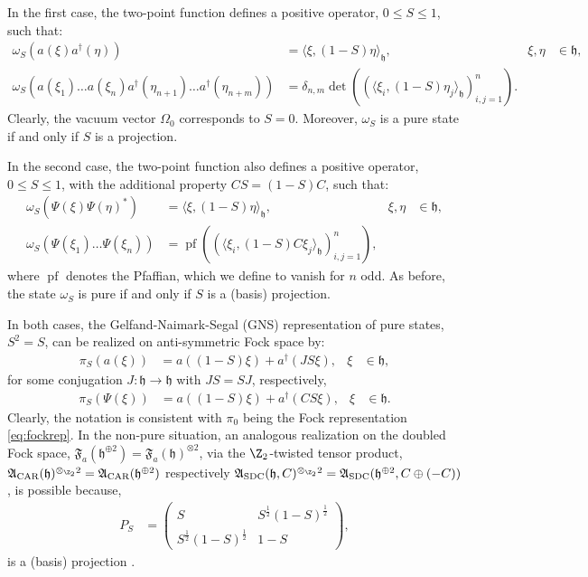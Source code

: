 \documentclass[a4paper, 11pt]{article}
\newcommand{\fA}{\mathfrak{A}}\newcommand{\cA}{\mathcal{A}}\newcommand{\dA}{\mathds{A}}\newcommand{\sA}{\mathscr{A}}
\newcommand{\fF}{\mathfrak{F}}\newcommand{\cF}{\mathcal{F}}\newcommand{\dF}{\mathds{F}}\newcommand{\sF}{\mathscr{F}}
\newcommand{\fh}{\mathfrak{h}}
\DeclareMathOperator{\1}{\mathds{1}}
\DeclareMathOperator{\pf}{pf}
\DeclareMathOperator{\CAR}{\textup{CAR}}
\DeclareMathOperator{\SDC}{\textup{SDC}}
\begin{document}
In the first case, the two-point function defines a positive operator, $0\leq S\leq1$, such that:
\begin{align}
\label{eq:carqfs}
\omega_{S}(a(\xi)a^{\dag}(\eta)) & = \langle\xi,(1-S)\eta\rangle_{\fh}, & \xi,\eta & \in\fh, \\ \nonumber
\omega_{S}(a(\xi_{1})\dots a(\xi_{n})a^{\dag}(\eta_{n+1})\dots a^{\dag}(\eta_{n+m})) & = \delta_{n,m}\det((\langle\xi_{i},(1-S)\eta_{j}\rangle_{\fh})_{i,j=1}^{n}).
\end{align}
Clearly, the vacuum vector $\Omega_{0}$ corresponds to $S=0$. Moreover, $\omega_{S}$ is a pure state if and only if $S$ is a projection.

In the second case, the two-point function also defines a positive operator, $0\leq S\leq 1$, with the additional property $CS = (1-S)C$, such that:
\begin{align}
\label{eq:sdcqfs}
\omega_{S}(\Psi(\xi)\Psi(\eta)^{*}) & = \langle\xi,(1-S)\eta\rangle_{\fh}, & \xi,\eta & \in\fh, \\ \nonumber
\omega_{S}(\Psi(\xi_{1})\dots \Psi(\xi_{n})) & = \pf((\langle\xi_{i},(1-S)C\xi_{j}\rangle_{\fh})_{i,j=1}^{n}),
\end{align}
where $\pf$ denotes the Pfaffian, which we define to vanish for $n$ odd. As before, the state $\omega_{S}$ is pure if and only if $S$ is a (basis) projection.

In both cases, the Gelfand-Naimark-Segal (GNS) representation of pure states, $S^{2}=S$, can be realized on anti-symmetric Fock space by:
\begin{align}
\label{eq:repqfpcar}
\pi_{S}(a(\xi)) & = a((1-S)\xi) + a^{\dag}(JS\xi), & \xi & \in\fh,
\end{align}
for some conjugation $J:\fh\rightarrow\fh$ with $JS = SJ$, respectively,
\begin{align}
\label{eq:repqfpsdc}
\pi_{S}(\Psi(\xi)) & = a((1-S)\xi) + a^{\dag}(CS\xi), & \xi & \in\fh.
\end{align}
Clearly, the notation is consistent with $\pi_{0}$ being the Fock representation \eqref{eq:fockrep}. In the non-pure situation, an analogous realization on the doubled Fock space, $\fF_{a}(\fh^{\oplus 2})=\fF_{a}(\fh)^{\otimes 2}$, via the $\Z_{2}$-twisted tensor product, $\fA_{\CAR}(\fh)^{\otimes_{\Z_{2}}2} = \fA_{\CAR}(\fh^{\oplus 2})$ respectively $\fA_{\SDC}(\fh,C)^{\otimes_{\Z_{2}}2} = \fA_{\SDC}(\fh^{\oplus 2},C\oplus(-C))$, is possible because,
\begin{align}
\label{eq:doubleproj}
P_{S} & = \begin{pmatrix} S & S^{\frac{1}{2}}(1-S)^{\frac{1}{2}} \\ S^{\frac{1}{2}}(1-S)^{\frac{1}{2}} & 1-S \end{pmatrix},
\end{align}
is a (basis) projection \cite{ArakiOnQuasiFree, LundbergQuasiFreeSecond}.
\end{document}
